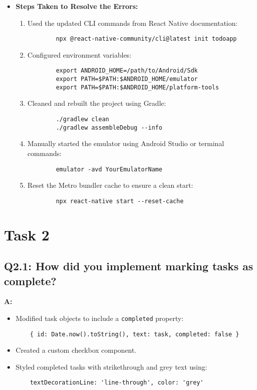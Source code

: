 \documentclass{article}
\begin{document}
\begin{itemize}
    \item \textbf{Steps Taken to Resolve the Errors:}
    \begin{enumerate}
        \item Used the updated CLI commands from React Native documentation:
        \begin{verbatim}
        npx @react-native-community/cli@latest init todoapp
        \end{verbatim}
        \item Configured environment variables:
        \begin{verbatim}
        export ANDROID_HOME=/path/to/Android/Sdk
        export PATH=$PATH:$ANDROID_HOME/emulator
        export PATH=$PATH:$ANDROID_HOME/platform-tools
        \end{verbatim}
        \item Cleaned and rebuilt the project using Gradle:
        \begin{verbatim}
        ./gradlew clean
        ./gradlew assembleDebug --info
        \end{verbatim}
        \item Manually started the emulator using Android Studio or terminal commands:
        \begin{verbatim}
        emulator -avd YourEmulatorName
        \end{verbatim}
        \item Reset the Metro bundler cache to ensure a clean start:
        \begin{verbatim}
        npx react-native start --reset-cache
        \end{verbatim}
    \end{enumerate}
\end{itemize}


\section*{Task 2}

\subsection*{Q2.1: How did you implement marking tasks as complete?}
\textbf{A:}
\begin{itemize}
    \item Modified task objects to include a \texttt{completed} property:
    \begin{verbatim}
    { id: Date.now().toString(), text: task, completed: false }
    \end{verbatim}
    \item Created a custom checkbox component.
    \item Styled completed tasks with strikethrough and grey text using:
    \begin{verbatim}
    textDecorationLine: 'line-through', color: 'grey'
    \end{verbatim}
\end{itemize}
\end{document}
